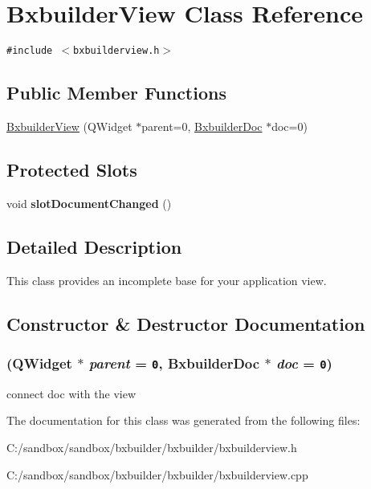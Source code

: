 \hypertarget{class_bxbuilder_view}{
\section{BxbuilderView Class Reference}
\label{class_bxbuilder_view}
}
{\tt \#include $<$bxbuilderview.h$>$}

\subsection*{Public Member Functions}
\begin{CompactItemize}
\item 
\hyperlink{class_bxbuilder_view_70168f721ca57dfac8bf537f174ab868}{BxbuilderView} (QWidget $\ast$parent=0, \hyperlink{class_bxbuilder_doc}{BxbuilderDoc} $\ast$doc=0)
\end{CompactItemize}
\subsection*{Protected Slots}
\begin{CompactItemize}
\item 
\hypertarget{class_bxbuilder_view_b7450067d9b2ddc4a4eec0df4e1d0d8a}{
void \textbf{slotDocumentChanged} ()}
\label{class_bxbuilder_view_b7450067d9b2ddc4a4eec0df4e1d0d8a}

\end{CompactItemize}


\subsection{Detailed Description}
This class provides an incomplete base for your application view. 

\subsection{Constructor \& Destructor Documentation}
\hypertarget{class_bxbuilder_view_70168f721ca57dfac8bf537f174ab868}{
\subsubsection[{BxbuilderView}]{ (QWidget $\ast$ {\em parent} = {\tt 0}, \/  {\bf BxbuilderDoc} $\ast$ {\em doc} = {\tt 0})}}
\label{class_bxbuilder_view_70168f721ca57dfac8bf537f174ab868}




connect doc with the view 

The documentation for this class was generated from the following files:\begin{CompactItemize}
\item 
C:/sandbox/sandbox/bxbuilder/bxbuilder/bxbuilderview.h\item 
C:/sandbox/sandbox/bxbuilder/bxbuilder/bxbuilderview.cpp\end{CompactItemize}
